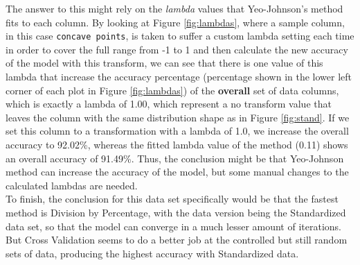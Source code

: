 \documentclass[11pt]{article}
\begin{document}
The answer to this might rely on the \textit{lambda} values that Yeo-Johnson's method fits to each column. By looking at Figure \ref{fig:lambdas}, where a sample column, in this case \verb$concave points$, is taken to suffer a custom lambda setting each time in order to cover the full range from -1 to 1 and then calculate the new accuracy of the model with this transform, we can see that there is one value of this lambda that increase the accuracy percentage (percentage shown in the lower left corner of each plot in Figure \ref{fig:lambdas}) of the \textbf{overall} set of data columns, which is exactly a lambda of 1.00, which represent a no transform value that leaves the column with the same distribution shape as in Figure \ref{fig:stand}. If we set this column to a transformation with a lambda of 1.0, we increase the overall accuracy to 92.02\%, whereas the fitted lambda value of the method (0.11) shows an overall accuracy of 91.49\%. Thus, the conclusion might be that Yeo-Johnson method can increase the accuracy of the model, but some manual changes to the calculated lambdas are needed.
\\

To finish, the conclusion for this data set specifically would be that the fastest method is Division by Percentage, with the data version being the Standardized data set, so that the model can converge in a much lesser amount of iterations. But Cross Validation seems to do a better job at the controlled but still random sets of data, producing the highest accuracy with Standardized data.

\printbibliography
 
\end{document}
